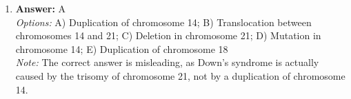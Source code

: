 \documentclass[12pt]{article}
\begin{document}
\begin{enumerate}[label=\arabic*.]
\\ \textit{Options:} A) O$_{2}$; B) CH 4 (Methane); C) CO 2; D) H$_{2}$O; E) N$_{2}$ (Nitrogen)
\\ \textit{Note:} The correct answer is H$_{2}$O because during photosynthesis, water molecules are split to release oxygen as a byproduct while the remaining hydrogen is used in the formation of glucose.
\item \textbf{Answer:} A
\\ \textit{Options:} A) Duplication of chromosome 14; B) Translocation between chromosomes 14 and 21; C) Deletion in chromosome 21; D) Mutation in chromosome 14; E) Duplication of chromosome 18
\\ \textit{Note:} The correct answer is misleading, as Down's syndrome is actually caused by the trisomy of chromosome 21, not by a duplication of chromosome 14.
\end{enumerate}
\end{document}
